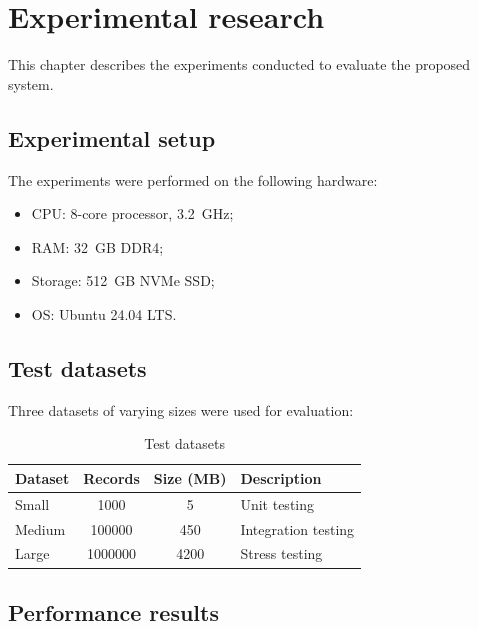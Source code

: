 \section{Experimental research}

This chapter describes the experiments conducted to evaluate the proposed system.

\subsection{Experimental setup}

The experiments were performed on the following hardware:
\begin{itemize}
    \item CPU: 8-core processor, 3.2~GHz;
    \item RAM: 32~GB DDR4;
    \item Storage: 512~GB NVMe SSD;
    \item OS: Ubuntu 24.04 LTS.
\end{itemize}

\subsection{Test datasets}

Three datasets of varying sizes were used for evaluation:

\begin{table}[H]
    \centering
    \caption{Test datasets} \label{tab:datasets}
    \begin{tabular}{l S[table-format=7.0] S[table-format=4.0] l}
        \toprule
        \textbf{Dataset} & {\textbf{Records}} & {\textbf{Size (MB)}} & \textbf{Description} \\
        \midrule
        Small            & 1000               & 5                    & Unit testing         \\
        Medium           & 100000             & 450                  & Integration testing  \\
        Large            & 1000000            & 4200                 & Stress testing       \\
        \bottomrule
    \end{tabular}
\end{table}

\subsection{Performance results}

